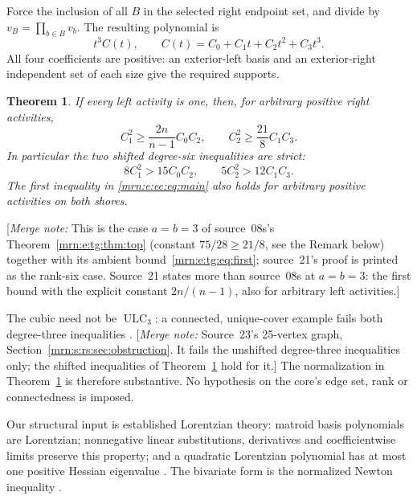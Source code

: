\documentclass[11pt,a4paper]{article}
\newtheorem{theorem}{Theorem}[section]
\theoremstyle{remark}\newtheorem{remark}[theorem]{Remark}
\newcommand{\ULC}{\operatorname{ULC}}      %
\newcommand{\mnote}[1]{[\textit{Merge note:} #1]}
\begin{document}
Force the inclusion of all $B$ in the selected right endpoint set, and divide by $v_B=\prod_{b\in B}v_b$. The resulting polynomial is
\[
 t^3C(t),\qquad C(t)=C_0+C_1t+C_2t^2+C_3t^3.
\]
All four coefficients are positive: an exterior-left basis and an exterior-right independent set of each size give the required supports.

\begin{theorem}\label{mrn:e:ec:thm:main}
If every left activity is one, then, for arbitrary positive right activities,
\begin{equation}\label{mrn:e:ec:eq:main}
 C_1^2\ge\frac{2n}{n-1}C_0C_2,\qquad
 C_2^2\ge\frac{21}{8}C_1C_3.
\end{equation}
In particular the two shifted degree-six inequalities are strict:
\[
 8C_1^2>15C_0C_2,\qquad 5C_2^2>12C_1C_3.
\]
The first inequality in \eqref{mrn:e:ec:eq:main} also holds for arbitrary positive activities on both shores.
\end{theorem}
\mnote{This is the case $a=b=3$ of source~08s's Theorem~\ref{mrn:e:tg:thm:top} (constant $75/28\ge21/8$, see the Remark below) together with its ambient bound~\eqref{mrn:e:tg:eq:first}; source~21's proof is printed as the rank-six case. Source~21 states more than source~08s at $a=b=3$: the first bound with the explicit constant $2n/(n-1)$, also for arbitrary left activities.}

The cubic need not be $\ULC_3$: a connected, unique-cover example fails both degree-three inequalities \cite{b:m23}. \mnote{Source~23's 25-vertex graph, Section~\ref{mrn:s:rs:sec:obstruction}. It fails the unshifted degree-three inequalities only; the shifted inequalities of Theorem~\ref{mrn:e:ec:thm:main} hold for it.} The normalization in Theorem~\ref{mrn:e:ec:thm:main} is therefore substantive. No hypothesis on the core's edge set, rank or connectedness is imposed.

Our structural input is established Lorentzian theory: matroid basis polynomials are Lorentzian; nonnegative linear substitutions, derivatives and coefficientwise limits preserve this property; and a quadratic Lorentzian polynomial has at most one positive Hessian eigenvalue \cite[Theorems 2.10, 2.25 and 3.10]{b:BH}. The bivariate form is the normalized Newton inequality \cite[Example 2.26]{b:BH}.
\end{document}
